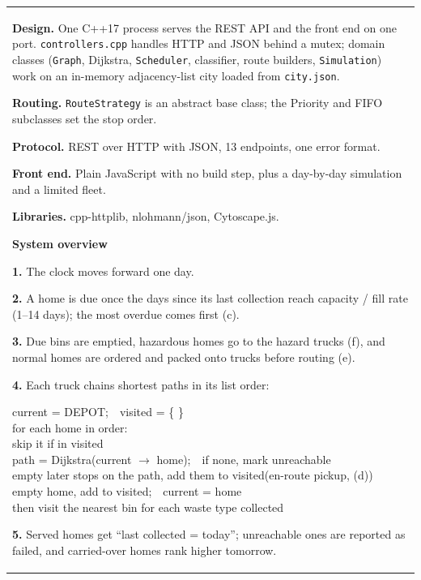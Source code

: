 \documentclass[12pt,a4paper]{article}
\newcommand{\formula}[1]{%
    \begin{center}
    \colorbox{DiagFill}{\parbox{0.92\linewidth}{\vspace{4pt}\centering\fontsize{10}{14}\selectfont #1\vspace{4pt}}}
    \end{center}
}
\newcommand{\answerbox}[2]{%
    \begin{tabularx}{\textwidth}{
        |>{\raggedright\arraybackslash}X|}
        \hline
        \parbox[t][#1][t]{\dimexpr\linewidth-12pt\relax}{
            \vspace{5pt}
            \fontsize{11}{13.5}\selectfont
            \setlength{\parskip}{4pt}
            #2
        }\\
        \hline
    \end{tabularx}
}
\begin{document}
\answerbox{14.7cm}{\textbf{Design.} One C++17 process serves the REST API and the front end on one port. \texttt{controllers.cpp} handles HTTP and JSON behind a mutex; domain classes (\texttt{Graph}, Dijkstra, \texttt{Scheduler}, classifier, route builders, \texttt{Simulation}) work on an in-memory adjacency-list city loaded from \texttt{city.json}.

\textbf{Routing.} \texttt{RouteStrategy} is an abstract base class; the Priority and FIFO subclasses set the stop order.

\textbf{Protocol.} REST over HTTP with JSON, 13 endpoints, one error format.

\textbf{Front end.} Plain JavaScript with no build step, plus a day-by-day simulation and a limited fleet.

\textbf{Libraries.} cpp-httplib, nlohmann/json, Cytoscape.js.

\vspace{2mm}
{\color{GEUBlue}\bfseries\fontsize{12}{14}\selectfont System overview} \quad {\small(diagrams (a)--(g) below)}

\textbf{1.} The clock moves forward one day.

\textbf{2.} A home is due once the days since its last collection reach capacity / fill rate (1--14 days); the most overdue comes first (c).

\textbf{3.} Due bins are emptied, hazardous homes go to the hazard trucks (f), and normal homes are ordered and packed onto trucks before routing (e).

\textbf{4.} Each truck chains shortest paths in its list order:
\formula{\raggedright\ttfamily\small
current = DEPOT;\ \ visited = \{ \}\\
for each home in order:\\
\hspace*{4mm}skip it if in visited\\
\hspace*{4mm}path = Dijkstra(current $\to$ home);\ \ if none, mark unreachable\\
\hspace*{4mm}empty later stops on the path, add them to visited\hfill\textrm{\small(en-route pickup, (d))}\\
\hspace*{4mm}empty home, add to visited;\ \ current = home\\
then visit the nearest bin for each waste type collected}

\textbf{5.} Served homes get ``last collected = today''; unreachable ones are reported as failed, and carried-over homes rank higher tomorrow.}
\end{document}
